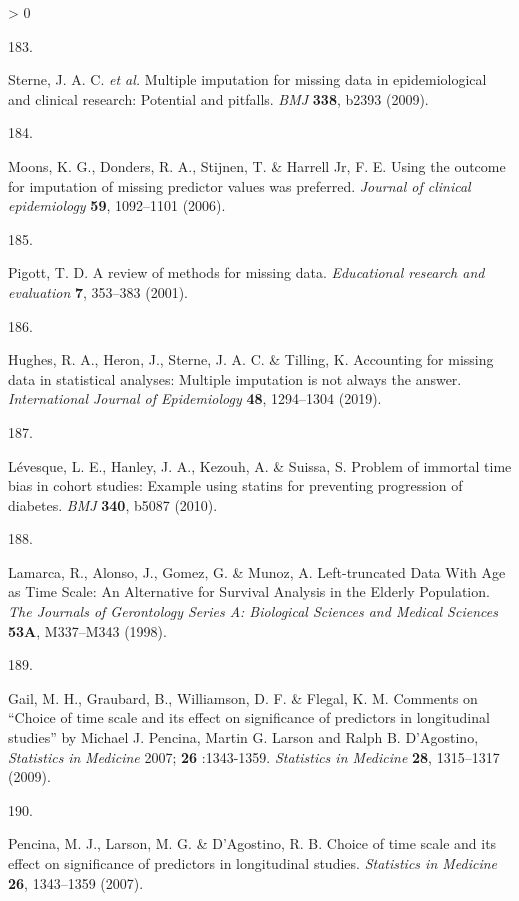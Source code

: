 \documentclass[a4paper, twoside]{templates/ociamthesis}
\newlength{\cslhangindent}
\newlength{\csllabelwidth}
\newenvironment{CSLReferences}[3] %
 {%
  \setlength{\parindent}{0pt}
  \ifodd #1 \everypar{\setlength{\hangindent}{\cslhangindent}}\ignorespaces\fi
  \ifnum #2 > 0
  \setlength{\parskip}{#2\baselineskip}
  \fi
 }%
 {}
\newcommand{\CSLLeftMargin}[1]{\parbox[t]{\maxof{\widthof{#1}}{\csllabelwidth}}{#1}}
\newcommand{\CSLRightInline}[1]{\parbox[t]{\linewidth - \csllabelwidth}{#1}}
\begin{document}
\begin{CSLReferences}{0}{0}
\leavevmode\hypertarget{ref-sterne2009}{}%
\CSLLeftMargin{183. }
\CSLRightInline{Sterne, J. A. C. \emph{et al.} Multiple imputation for missing data in epidemiological and clinical research: Potential and pitfalls. \emph{BMJ} \textbf{338}, b2393 (2009).}

\leavevmode\hypertarget{ref-moons2006using}{}%
\CSLLeftMargin{184. }
\CSLRightInline{Moons, K. G., Donders, R. A., Stijnen, T. \& Harrell Jr, F. E. Using the outcome for imputation of missing predictor values was preferred. \emph{Journal of clinical epidemiology} \textbf{59}, 1092--1101 (2006).}

\leavevmode\hypertarget{ref-pigott2001review}{}%
\CSLLeftMargin{185. }
\CSLRightInline{Pigott, T. D. A review of methods for missing data. \emph{Educational research and evaluation} \textbf{7}, 353--383 (2001).}

\leavevmode\hypertarget{ref-hughes2019}{}%
\CSLLeftMargin{186. }
\CSLRightInline{Hughes, R. A., Heron, J., Sterne, J. A. C. \& Tilling, K. Accounting for missing data in statistical analyses: Multiple imputation is not always the answer. \emph{International Journal of Epidemiology} \textbf{48}, 1294--1304 (2019).}

\leavevmode\hypertarget{ref-levesque2010}{}%
\CSLLeftMargin{187. }
\CSLRightInline{Lévesque, L. E., Hanley, J. A., Kezouh, A. \& Suissa, S. Problem of immortal time bias in cohort studies: Example using statins for preventing progression of diabetes. \emph{BMJ} \textbf{340}, b5087 (2010).}

\leavevmode\hypertarget{ref-lamarca1998}{}%
\CSLLeftMargin{188. }
\CSLRightInline{Lamarca, R., Alonso, J., Gomez, G. \& Munoz, A. Left-truncated {Data With Age} as {Time Scale}: {An Alternative} for {Survival Analysis} in the {Elderly Population}. \emph{The Journals of Gerontology Series A: Biological Sciences and Medical Sciences} \textbf{53A}, M337--M343 (1998).}

\leavevmode\hypertarget{ref-gail2009}{}%
\CSLLeftMargin{189. }
\CSLRightInline{Gail, M. H., Graubard, B., Williamson, D. F. \& Flegal, K. M. Comments on {``{Choice} of time scale and its effect on significance of predictors in longitudinal studies''} by {Michael J}. {Pencina}, {Martin G}. {Larson} and {Ralph B}. {D}'{Agostino}, {\emph{Statistics}}{ \emph{in} }{\emph{Medicine}} 2007; {\textbf{26}} :1343-1359. \emph{Statistics in Medicine} \textbf{28}, 1315--1317 (2009).}

\leavevmode\hypertarget{ref-pencina2007}{}%
\CSLLeftMargin{190. }
\CSLRightInline{Pencina, M. J., Larson, M. G. \& D'Agostino, R. B. Choice of time scale and its effect on significance of predictors in longitudinal studies. \emph{Statistics in Medicine} \textbf{26}, 1343--1359 (2007).}


\end{CSLReferences}
\end{document}
